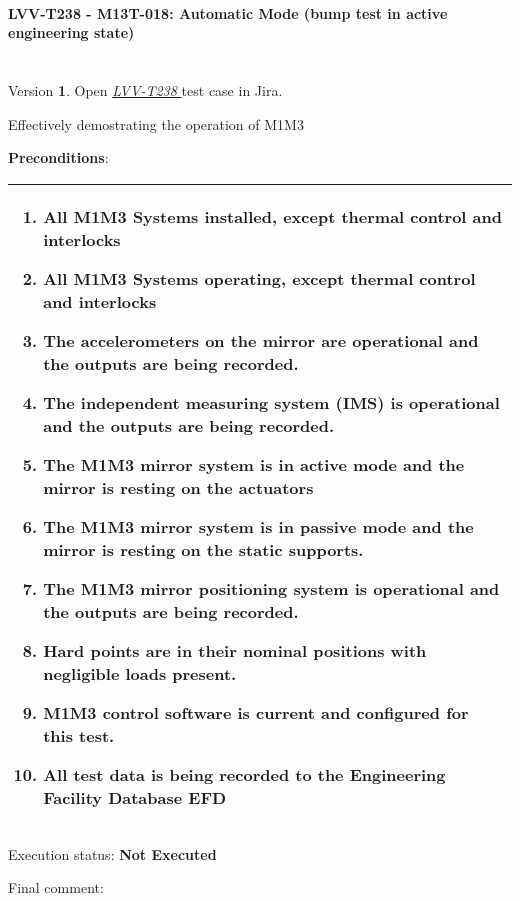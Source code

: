 \documentclass[SE,lsstdraft,STR,toc]{lsstdoc}
\providecommand{\tightlist}{
  \setlength{\itemsep}{0pt}\setlength{\parskip}{0pt}}
\begin{document}
\paragraph{ LVV-T238 - M13T-018: Automatic Mode (bump test in active engineering state) }\mbox{}\\

Version \textbf{1}.
Open  \href{https://jira.lsstcorp.org/secure/Tests.jspa#/testCase/LVV-T238}{\textit{ LVV-T238 } }
test case in Jira.

Effectively demostrating the operation of M1M3

\textbf{ Preconditions}:\\
\begin{longtable}[]{@{}l@{}}
\toprule
\begin{minipage}[t]{0.97\columnwidth}\raggedright\strut
\begin{enumerate}
\tightlist
\item
  All M1M3 Systems installed, except thermal control and interlocks
\item
  All M1M3 Systems operating, except thermal control and interlocks
\item
  The accelerometers on the mirror are operational and the outputs are
  being recorded.
\item
  The independent measuring system (IMS) is operational and the outputs
  are being recorded.
\item
  The M1M3 mirror system is in active mode and the mirror is resting on
  the actuators
\item
  The M1M3 mirror system is in passive mode and the mirror is resting on
  the static supports.
\item
  The M1M3 mirror positioning system is operational and the outputs are
  being recorded.
\item
  Hard points are in their nominal positions with negligible loads
  present.
\item
  M1M3 control software is current and configured for this test.
\item
  All test data is being recorded to the Engineering Facility Database
  EFD
\end{enumerate}\strut
\end{minipage}\tabularnewline
\bottomrule
\end{longtable}

Execution status: {\bf Not Executed }

Final comment:\\
\end{document}
